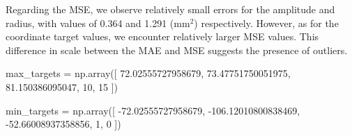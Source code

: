 \documentclass[a4paper, UKenglish, 11pt]{uiomaster}
\begin{document}
Regarding the MSE, we observe relatively small errors for the amplitude and radius, with values of 0.364 and 1.291 (mm$^2$) respectively. However, as for the coordinate target values, we encounter relatively larger MSE values. This difference in scale between the MAE and MSE suggests the presence of outliers.


max_targets = np.array([
        72.02555727958679,
        73.47751750051975,
        81.150386095047,
        10,
        15
    ])

    min_targets = np.array([
        -72.02555727958679,
        -106.12010800838469,
        -52.66008937358856,
        1,
        0
    ])




\end{document}
